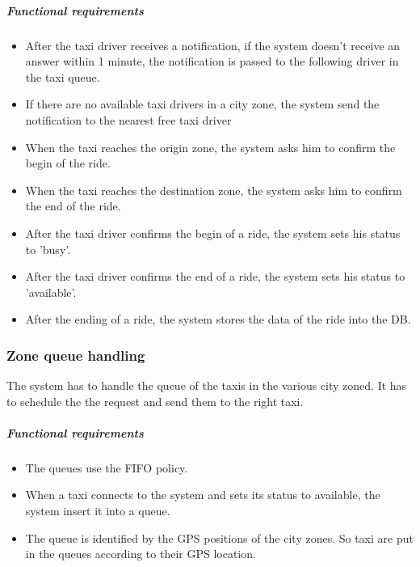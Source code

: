 	\subparagraph{Functional requirements}
	\noindent
		\begin{itemize}
			\item After the taxi driver receives a notification, if the system doesn't receive an answer within 1 minute, the notification is passed to the following driver in the taxi queue.
			\item If there are no available taxi drivers in a city zone, the system send the notification to the nearest free taxi driver
			\item When the taxi reaches the origin zone, the system asks him to confirm the begin of the ride.
			\item When the taxi reaches the destination zone, the system asks him to confirm the end of the ride.
			\item After the taxi driver confirms the begin of a ride, the system sets his status to 'busy'.
			\item After the taxi driver confirms the end of a ride, the system sets his status to 'available'.
			\item After the ending of a ride, the system stores the data of the ride into the DB.
		\end{itemize}


\subsubsection{Zone queue handling}
The system has to handle the queue of the taxis in the various city zoned. It has to schedule the the request and send them to the right taxi.

	\subparagraph{Functional requirements}
	\noindent
		\begin{itemize}
			\item The queues use the FIFO policy.
			\item When a taxi connects to the system and sets its status to available, the system insert it into a queue.
			\item The queue is identified by the GPS positions of the city zones. So taxi are put in the queues according to their GPS location.
		\end{itemize}

